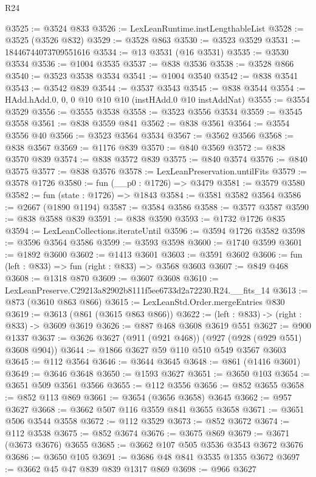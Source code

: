 \begin{lexlean}{R24}
\begin{coremodule}
@3525 := @3524 @833
@3526 := LexLeanRuntime.instLengthableList
@3528 := @3525 (@3526 @832)
@3529 := @3528 @863
@3530 := @3523 @3529
@3531 := 18446744073709551616
@3534 := @13 @3531 (@16 @3531)
@3535 := @3530 @3534
@3536 := @1004 @3535
@3537 := @838 @3536
@3538 := @3528 @866
@3540 := @3523 @3538 @3534
@3541 := @1004 @3540
@3542 := @838 @3541
@3543 := @3542 @839
@3544 := @3537 @3543
@3545 := @838 @3544
@3554 := HAdd.hAdd.{0, 0, 0} @10 @10 @10 (instHAdd.{0} @10 instAddNat)
@3555 := @3554 @3529
@3556 := @3555 @3538
@3558 := @3523 @3556 @3534
@3559 := @3545 @3558
@3561 := @838 @3559 @841
@3562 := @838 @3561
@3564 := @3554 @3556 @40
@3566 := @3523 @3564 @3534
@3567 := @3562 @3566
@3568 := @838 @3567
@3569 := @1176 @839
@3570 := @840 @3569
@3572 := @838 @3570 @839
@3574 := @838 @3572 @839
@3575 := @840 @3574
@3576 := @840 @3575
@3577 := @838 @3576
@3578 := LexLeanPreservation.untilFits
@3579 := @3578 @1726
@3580 := fun (__p0 : @1726) => @3479
@3581 := @3579 @3580
@3582 := fun (state : @1726) => @1843
@3584 := @3581 @3582 @3564
@3586 := @2667 (@1890 @1194)
@3587 := @3584 @3586
@3588 := @3577 @3587
@3590 := @838 @3588 @839
@3591 := @838 @3590
@3593 := @1732 @1726 @835
@3594 := LexLeanCollections.iterateUntil
@3596 := @3594 @1726 @3582
@3598 := @3596 @3564 @3586
@3599 := @3593 @3598
@3600 := @1740 @3599
@3601 := @1892 @3600
@3602 := @1413 @3601
@3603 := @3591 @3602
@3606 := fun (left : @833) => fun (right : @833) => @3568 @3603
@3607 := @849 @468
@3608 := @1318 @870
@3609 := @3607 @3608
@3610 := LexLeanPreserve.C29213a82902b8111f5ee6733d2a72230.R24.__fits_14
@3613 := @873 (@3610 @863 @866)
@3615 := LexLeanStd.Order.mergeEntries @830
@3619 := @3613 (@861 (@3615 @863 @866))
@3622 := (left : @833) -> (right : @833) -> @3609 @3619
@3626 := @887 @468 @3608 @3619 @551
@3627 := @900 @1337
@3637 := @3626 @3627 (@911 (@921 @468)) (@927 (@928 (@929 @551) @3608 @904))
@3644 := @1866 @3627 @59 @110 @510 @549 @3567 @3603
@3645 := @112 @3564
@3646 := @3644 @3645
@3648 := @861 (@1416 @3601)
@3649 := @3646 @3648
@3650 := @1593 @3627
@3651 := @3650 @103
@3654 := @3651 @509 @3561 @3566
@3655 := @112 @3556
@3656 := @852 @3655
@3658 := @852 @113 @869
@3661 := @3654 (@3656 @3658) @3645
@3662 := @957 @3627
@3668 := @3662 @507 @116 @3559 @841 @3655 @3658
@3671 := @3651 @506 @3544 @3558
@3672 := @112 @3529
@3673 := @852 @3672
@3674 := @112 @3538
@3675 := @852 @3674
@3676 := @3675 @869
@3679 := @3671 (@3673 @3676) @3655
@3685 := @3662 @107 @505 @3536 @3543 @3672 @3676
@3686 := @3650 @105
@3691 := @3686 @48 @841 @3535 @1355 @3672
@3697 := @3662 @45 @47 @839 @839 @1317 @869
@3698 := @966 @3627

\end{coremodule}
\end{lexlean}
